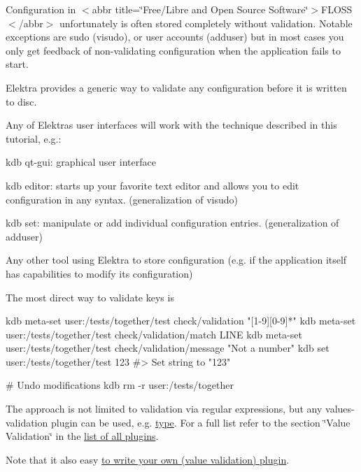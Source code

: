 Configuration in $<$abbr title=\char`\"{}\+Free/\+Libre and Open Source Software\char`\"{}$>$F\+L\+O\+SS$<$/abbr$>$ unfortunately is often stored completely without validation. Notable exceptions are sudo ({\ttfamily visudo}), or user accounts ({\ttfamily adduser}) but in most cases you only get feedback of non-\/validating configuration when the application fails to start.

Elektra provides a generic way to validate any configuration before it is written to disc.

Any of Elektra\textquotesingle{}s user interfaces will work with the technique described in this tutorial, e.\+g.\+:


\begin{DoxyEnumerate}
\item {\ttfamily kdb qt-\/gui}\+: graphical user interface
\item {\ttfamily kdb editor}\+: starts up your favorite text editor and allows you to edit configuration in any syntax. (generalization of {\ttfamily visudo})
\item {\ttfamily kdb set}\+: manipulate or add individual configuration entries. (generalization of {\ttfamily adduser})
\item Any other tool using Elektra to store configuration (e.\+g. if the application itself has capabilities to modify its configuration)
\end{DoxyEnumerate}

The most direct way to validate keys is


\begin{DoxyCode}
kdb meta-set user:/tests/together/test check/validation "[1-9][0-9]*"
kdb meta-set user:/tests/together/test check/validation/match LINE
kdb meta-set user:/tests/together/test check/validation/message "Not a number"
kdb set user:/tests/together/test 123
#> Set string to "123"

# Undo modifications
kdb rm -r user:/tests/together
\end{DoxyCode}


The approach is not limited to validation via regular expressions, but any values-\/validation plugin can be used, e.\+g. \hyperlink{autotoc_md752_src_plugins_type_README_md}{type}. For a full list refer to the section \char`\"{}\+Value Validation\char`\"{} in the \hyperlink{src_plugins_README_md}{list of all plugins}.

Note that it also easy \hyperlink{doc_tutorials_plugins_md}{to write your own (value validation) plugin}.

